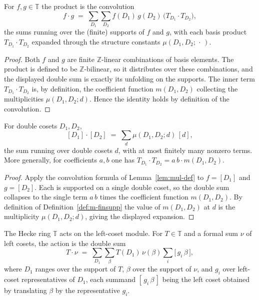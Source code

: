 \begin{lemma}\label{lem:mul-def}
\leanok
For $f,g\in\mathbb{T}$ the product is the convolution
\[
  f\cdot g \;=\; \sum_{D_1}\sum_{D_2} f(D_1)\,g(D_2)\,\bigl(T_{D_1}\cdot T_{D_2}\bigr),
\]
the sums running over the (finite) supports of $f$ and $g$, with each basis product
$T_{D_1}\cdot T_{D_2}$ expanded through the structure constants $\mu(D_1,D_2;\,\cdot\,)$.
\end{lemma}

\begin{proof}
\leanok
Both $f$ and $g$ are finite $\mathbb{Z}$-linear combinations of basis elements. The
product is defined to be $\mathbb{Z}$-bilinear, so it distributes over these
combinations, and the displayed double sum is exactly its unfolding on the supports. The
inner term $T_{D_1}\cdot T_{D_2}$ is, by definition, the coefficient function
$m(D_1,D_2)$ collecting the multiplicities $\mu(D_1,D_2;d)$. Hence the identity holds by
definition of the convolution.
\end{proof}

\begin{lemma}\label{lem:T-single-mul}
\leanok
For double cosets $D_1,D_2$,
\[
  [D_1]\cdot[D_2] \;=\; \sum_{d} \mu(D_1,D_2;d)\,[d],
\]
the sum running over double cosets $d$, with at most finitely many nonzero terms. More
generally, for coefficients $a,b$ one has
$T_{D_1}\cdot T_{D_2}=a\,b\cdot m(D_1,D_2)$.
\end{lemma}

\begin{proof}
\leanok
Apply the convolution formula of Lemma~\ref{lem:mul-def} to $f=[D_1]$ and $g=[D_2]$. Each
is supported on a single double coset, so the double sum collapses to the single term
$a\,b$ times the coefficient function $m(D_1,D_2)$. By definition of
Definition~\ref{def:m-finsupp} the value of $m(D_1,D_2)$ at $d$ is the multiplicity
$\mu(D_1,D_2;d)$, giving the displayed expansion.
\end{proof}

\begin{lemma}\label{lem:smul-eq-sum}
\leanok
The Hecke ring $\mathbb{T}$ acts on the left-coset module. For $T\in\mathbb{T}$ and a
formal sum $\nu$ of left cosets, the action is the double sum
\[
  T\cdot\nu \;=\; \sum_{D_1}\sum_{\beta} T(D_1)\,\nu(\beta)
    \sum_{i} \bigl[\,g_i\,\beta\,\bigr],
\]
where $D_1$ ranges over the support of $T$, $\beta$ over the support of $\nu$, and $g_i$
over left-coset representatives of $D_1$, each summand $[\,g_i\,\beta\,]$ being the left
coset obtained by translating $\beta$ by the representative $g_i$.
\end{lemma}


